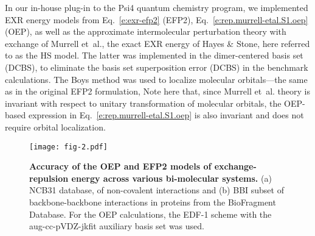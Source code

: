 In our in\hyp{}house plug-in to the {\sc Psi4}
quantum chemistry
program,\cite{Psi4.JCTC.2017}
we implemented EXR energy models from Eq.~\eqref{e:exr-efp2}
(EFP2), Eq.~\eqref{e:rep.murrell-etal.S1.oep} (OEP), as well as 
the approximate intermolecular perturbation theory with exchange of 
Murrell et~al.\cite{Murrell.Randic.Williams.Longuet-Higgins.ProcRSocLondA.1965},
the exact EXR energy of Hayes \& Stone\cite{Hayes.Stone.MolPhys.1984},
here referred to as the HS model.
The latter was
implemented in the dimer\hyp{}centered basis set\cite{Chalasinski.Gutowski.MolPhys.1985} (DCBS),
to eliminate the basis set
superposition error (DCBS) in the benchmark calculations.
The Boys method\cite{Boys.RevModPhys.1960} was used to localize
molecular orbitals---the same as in the original EFP2 formulation,
Note here that, since
Murrell et~al. theory is invariant with respect to unitary transformation
of molecular orbitals, the OEP\hyp{}based expression 
in Eq.~\eqref{e:rep.murrell-etal.S1.oep} is also invariant and does not require
orbital localization. 
%
%
%
\begin{figure*}[t]
\texttt{[image: fig-2.pdf]}
\caption{\label{f:fig-2} {\bf Accuracy of the OEP and EFP2 models of exchange\hyp{}repulsion energy
across various bi\hyp{}molecular systems.} 
(a) NCB31 
database,\cite{Zhao.Schultz.Truhlar.JCTC.2006,
Zhao.Truhlar.JCTC.2005,Zhao.Schultz.Truhlar.JCTC.2006,Zhao.Schultz.Truhlar.JCP.2005} 
of non\hyp{}covalent interactions
and
(b) BBI subset\cite{Burns.Faver.Zheng.Marshall.Smith.Vanommeslaeghe.MacKerell.Merz.Sherrill.JCP.2017} 
of backbone\hyp{}backbone interactions in proteins from the BioFragment Database.
For the OEP calculations, the EDF-1 scheme with the aug-cc-pVDZ-jkfit auxiliary basis set
was used.
} 
\end{figure*}
%

